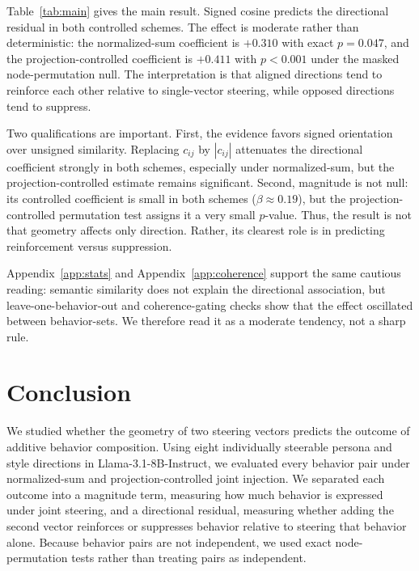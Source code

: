 \documentclass{article}
\begin{document}
Table~\ref{tab:main} gives the main result. Signed cosine predicts the directional residual in both
controlled schemes. The effect is moderate rather than deterministic: the normalized-sum coefficient
is $+0.310$ with exact $p=0.047$, and the projection-controlled coefficient is $+0.411$ with
$p<0.001$ under the masked node-permutation null. The interpretation is that aligned directions tend
to reinforce each other relative to single-vector steering, while opposed directions tend to
suppress.

Two qualifications are important. First, the evidence favors signed orientation over unsigned
similarity. Replacing $c_{ij}$ by $|c_{ij}|$ attenuates the
directional coefficient strongly in both schemes, especially under normalized-sum, but the
projection-controlled estimate remains significant. Second, magnitude
is not null: its controlled coefficient is small in both schemes ($\beta\approx0.19$), but the
projection-controlled permutation test assigns it a very small $p$-value. Thus, the result is not that geometry affects only direction. Rather, its clearest role is in
predicting reinforcement versus suppression.

Appendix~\ref{app:stats} and Appendix~\ref{app:coherence} support the same cautious reading:
semantic similarity does not explain the directional association, but leave-one-behavior-out and
coherence-gating checks show that the effect oscillated between behavior-sets. We therefore read it as a
moderate tendency, not a sharp rule.

\section{Conclusion}

We studied whether the geometry of two steering vectors predicts the outcome of additive behavior
composition. Using eight individually steerable persona and style directions in
Llama-3.1-8B-Instruct, we evaluated every behavior pair under normalized-sum and
projection-controlled joint injection. We separated each outcome into a magnitude term, measuring
how much behavior is expressed under joint steering, and a directional residual, measuring whether
adding the second vector reinforces or suppresses behavior relative to steering that behavior alone.
Because behavior pairs are not independent, we used exact node-permutation tests rather than
treating pairs as independent.
\end{document}
